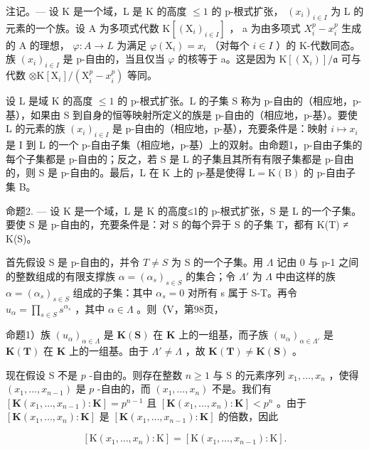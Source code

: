 注记。--- 设 K 是一个域，L 是 K 的高度 \(\leqslant1\) 的 p-根式扩张， \((x_{i})_{i\in I}\) 为 L 的元素的一个族。设 A 为多项式代数 \(\mathrm{K}[(\mathrm{X}_{i})_{i\in I}]\) ， a 为由多项式 \(X_{i}^{p}-x_{i}^{p}\) 生成的 A 的理想， \(\varphi:A\to L\) 为满足 \(\varphi(\mathrm{X}_{i})=x_{i}\) （对每个 \(i\in I\) ）的 K-代数同态。族 \((x_{i})_{i\in I}\) 是 p-自由的，当且仅当 \(\varphi\) 的核等于 a。这是因为 \(\mathrm{K}[(\mathrm{X}_{i})]/\mathfrak{a}\) 可与代数 \(\otimes\mathrm{K}[\mathrm{X}_{i}]/(\mathrm{X}_{i}^{p}-x_{i}^{p})\) 等同。

设 L 是域 K 的高度 \(\leqslant1\) 的 p-根式扩张。L 的子集 S 称为 p-自由的（相应地，p-基），如果由 S 到自身的恒等映射所定义的族是 p-自由的（相应地，p-基）。要使 L 的元素的族 \((x_{i})_{i\in I}\) 是 p-自由的（相应地，p-基），充要条件是：映射 \(i\mapsto x_{i}\) 是 I 到 L 的一个 p-自由子集（相应地，p-基）上的双射。由命题1，p-自由子集的每个子集都是 p-自由的；反之，若 S 是 L 的子集且其所有有限子集都是 p-自由的，则 S 是 p-自由的。最后，L 在 K 上的 p-基是使得 \(\mathrm{L}=\mathrm{K}(\mathrm{B})\) 的 p-自由子集 B。

命题2. --- 设 K 是一个域，L 是 K 的高度≤1的 p-根式扩张，S 是 L 的一个子集。要使 S 是 p-自由的，充要条件是：对 S 的每个异于 S 的子集 T，都有 K(T) ≠ K(S)。

首先假设 S 是 p-自由的，并令 \(T \neq S\) 为 S 的一个子集。用 \(\Lambda\) 记由 0 与 p-1 之间的整数组成的有限支撑族 \(\alpha = (\alpha_{s})_{s \in S}\) 的集合；令 \(\Lambda'\) 为 \(\Lambda\) 中由这样的族 \(\alpha = (\alpha_{s})_{s \in S}\) 组成的子集：其中 \(\alpha_{s} = 0\) 对所有 s 属于 S-T。再令 \(u_{\alpha} = \prod_{s \in S} s^{\alpha_{s}}\) ，其中 \(\alpha \in \Lambda\) 。则（V，第98页，

命题1）族 \((u_{\alpha})_{\alpha \in \Lambda}\) 是 \(\mathbf{K}(\mathbf{S})\) 在 \(\mathbf{K}\) 上的一组基，而子族 \((u_{\alpha})_{\alpha \in \Lambda'}\) 是 \(\mathbf{K}(\mathbf{T})\) 在 \(\mathbf{K}\) 上的一组基。由于 \(\Lambda' \neq \Lambda\) ，故 \(\mathbf{K}(\mathbf{T}) \neq \mathbf{K}(\mathbf{S})\) 。

现在假设 S 不是 \(p\) -自由的。则存在整数 \(n \geqslant 1\) 与 S 的元素序列 \(x_1, \ldots, x_n\) ，使得 \((x_1, \ldots, x_{n-1})\) 是 \(p\) -自由的，而 \((x_1, \ldots, x_n)\) 不是。我们有 \([\mathbf{K}(x_1, \ldots, x_{n-1}) : \mathbf{K}] = p^{n-1}\) 且 \([\mathbf{K}(x_1, \ldots, x_n) : \mathbf{K}] < p^n\) 。由于 \([\mathbf{K}(x_1, \ldots, x_n) : \mathbf{K}]\) 是 \([\mathbf{K}(x_1, \ldots, x_{n-1}) : \mathbf{K}]\) 的倍数，因此

\[
[ \mathrm{K} (x _ {1}, \dots , x _ {n}): \mathrm{K} ] = [ \mathrm{K} (x _ {1}, \dots , x _ {n - 1}): \mathrm{K} ].
\]

